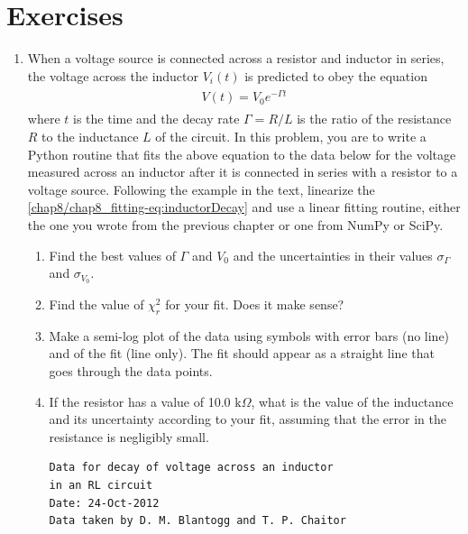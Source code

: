 \documentclass[letterpaper,10pt,english]{sphinxmanual}
\begin{document}
\section{Exercises}
\label{chap8/chap8_fitting:exercises}\begin{enumerate}
\item {} 
When a voltage source is connected across a resistor and inductor in series, the voltage across the inductor $V_i(t)$ is predicted to obey the equation
\label{chap8/chap8_fitting:equation-eq:inductorDecay}\begin{gather}
\begin{split}V(t) = V_0 e^{-\Gamma t}\end{split}\label{chap8/chap8_fitting-eq:inductorDecay}
\end{gather}
where $t$ is the time and the decay rate $\Gamma=R/L$ is the ratio of the  resistance $R$ to the inductance $L$ of the circuit.  In this problem, you are to write a Python routine that fits the above equation to the data below for the voltage measured across an inductor after it is connected in series with a resistor to a voltage source.  Following the example in the text, linearize the \eqref{chap8/chap8_fitting-eq:inductorDecay} and use a linear fitting routine, either the one you wrote from the previous chapter or one from NumPy or SciPy.
\begin{enumerate}
\item {} 
Find the best values of $\Gamma$ and $V_0$ and the uncertainties in their values $\sigma_\Gamma$ and $\sigma_{V_0}$.

\item {} 
Find the value of $\chi_r^2$ for your fit.  Does it make sense?

\item {} 
Make a semi-log plot of the data using symbols with error bars (no line) and of the fit (line only).  The fit should appear as a straight line that goes through the data points.

\item {} 
If the resistor has a value of 10.0 $\mathrm{k}\Omega$, what is the value of the inductance and its uncertainty according to your fit, assuming that the error in the resistance is negligibly small.

\begin{Verbatim}[commandchars=\\\{\}]
Data for decay of voltage across an inductor
in an RL circuit
Date: 24-Oct-2012
Data taken by D. M. Blantogg and T. P. Chaitor


\end{Verbatim}
\end{enumerate}
\end{enumerate}
\end{document}
